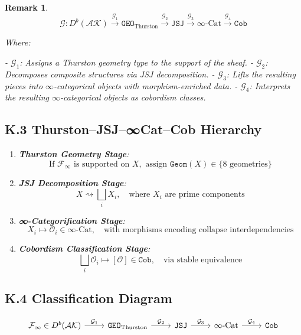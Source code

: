 \documentclass[11pt]{article}
\newtheorem{remark}[theorem]{Remark}
\begin{document}
\begin{remark}
\[
\mathcal{G} : D^b(\mathcal{AK}) \xrightarrow{\mathcal{G}_1} \texttt{GEO}_{\text{Thurston}} 
\xrightarrow{\mathcal{G}_2} \texttt{JSJ} \xrightarrow{\mathcal{G}_3} \infty\text{-Cat} 
\xrightarrow{\mathcal{G}_4} \texttt{Cob}
\]

Where:

- \( \mathcal{G}_1 \): Assigns a Thurston geometry type to the support of the sheaf.
- \( \mathcal{G}_2 \): Decomposes composite structures via JSJ decomposition.
- \( \mathcal{G}_3 \): Lifts the resulting pieces into $\infty$-categorical objects with morphism-enriched data.
- \( \mathcal{G}_4 \): Interprets the resulting $\infty$-categorical objects as cobordism classes.

\subsection*{K.3 Thurston–JSJ–∞Cat–Cob Hierarchy}

\begin{enumerate}
  \item \textbf{Thurston Geometry Stage}:
  \[
  \text{If } \mathcal{F}_\infty \text{ is supported on } X, \text{ assign } \texttt{Geom}(X) \in \{ \text{8 geometries} \}
  \]

  \item \textbf{JSJ Decomposition Stage}:
  \[
  X \rightsquigarrow \bigsqcup_i X_i, \quad \text{where } X_i \text{ are prime components}
  \]

  \item \textbf{∞-Categorification Stage}:
  \[
  X_i \mapsto \mathcal{O}_i \in \infty\text{-Cat}, \quad \text{with morphisms encoding collapse interdependencies}
  \]

  \item \textbf{Cobordism Classification Stage}:
  \[
  \bigsqcup_i \mathcal{O}_i \longmapsto [\mathcal{O}] \in \texttt{Cob}, \quad \text{via stable equivalence}
  \]
\end{enumerate}

\subsection*{K.4 Classification Diagram}

\[
\begin{tikzcd}
\mathcal{F}_\infty \in D^b(\mathcal{AK}) \arrow[r, "\mathcal{G}_1"] & \texttt{GEO}_{\text{Thurston}} \arrow[r, "\mathcal{G}_2"] & \texttt{JSJ} \arrow[r, "\mathcal{G}_3"] & \infty\text{-Cat} \arrow[r, "\mathcal{G}_4"] & \texttt{Cob}
\end{tikzcd}
\]


\end{remark}
\end{document}
